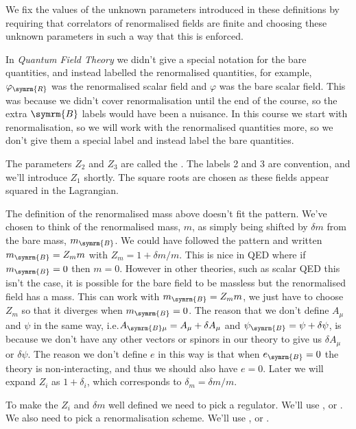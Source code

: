 \documentclass[fleqn]{NotesClass}
\newcommand*{\course}[1]{\textit{#1}}
\newcommand{\MSbar}{\ensuremath{\overline{\symrm{MS}}}}
\newcommand{\bare}{\symrm{B}}
\begin{document}
    We fix the values of the unknown parameters introduced in these definitions by requiring that correlators of renormalised fields are finite and choosing these unknown parameters in such a way that this is enforced.

    In \course{Quantum Field Theory} we didn't give a special notation for the bare quantities, and instead labelled the renormalised quantities, for example, \(\varphi_{\symrm{R}}\) was the renormalised scalar field and \(\varphi\) was the bare scalar field.
    This was because we didn't cover renormalisation until the end of the course, so the extra \(\bare\) labels would have been a nuisance.
    In this course we start with renormalisation, so we will work with the renormalised quantities more, so we don't give them a special label and instead label the bare quantities.
    
    The parameters \(Z_2\) and \(Z_3\) are called the .
    The labels 2 and 3 are convention, and we'll introduce \(Z_1\) shortly.
    The square roots are chosen as these fields appear squared in the Lagrangian.
    
    The definition of the renormalised mass above doesn't fit the pattern.
    We've chosen to think of the renormalised mass, \(m\), as simply being shifted by \(\delta m\) from the bare mass, \(m_{\bare}\).
    We could have followed the pattern and written \(m_{\bare} = Z_mm\) with \(Z_m = 1 + \delta m/m\).
    This is nice in QED where if \(m_{\bare} = 0\) then \(m = 0\).
    However in other theories, such as scalar QED this isn't the case, it is possible for the bare field to be massless but the renormalised field has a mass.
    This can work with \(m_{\bare} = Z_mm\), we just have to choose \(Z_m\) so that it diverges when \(m_{\bare} = 0\).
    The reason that we don't define \(A_\mu\) and \(\psi\) in the same way, i.e.\@ \(A_{\bare\mu} = A_{\mu} + \delta A_\mu\) and \(\psi_{\bare} = \psi + \delta \psi\), is because we don't have any other vectors or spinors in our theory to give us \(\delta A_\mu\) or \(\delta \psi\).
    The reason we don't define \(e\) in this way is that when \(e_{\bare} = 0\) the theory is non-interacting, and thus we should also have \(e = 0\).
    Later we will expand \(Z_i\) as \(1 + \delta_i\), which corresponds to \(\delta_m = \delta m/m\).
    
    To make the \(Z_i\) and \(\delta m\) well defined we need to pick a regulator.
    We'll use , or .
    We also need to pick a renormalisation scheme.
    We'll use , or \define{\MSbar}\index{MS@\MSbar}.
    
\end{document}
